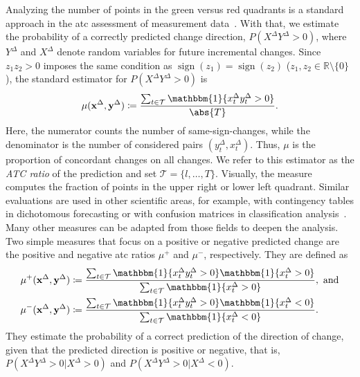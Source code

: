\documentclass[pdflatex]{sn-jnl}
\theoremstyle{plain}%
\theoremstyle{definition}
\DeclarePairedDelimiter{\abs}\lvert\rvert
\DeclareMathOperator{\sign}{sign}
\newcommand{\ind}[1]{\mathbbm{1}\{#1\}}
\newcommand{\card}[1]{\abs{#1}}
\newcommand{\R}{\mathbb{R}}
\newcommand{\diffx}{\mathbf{x}^{\Delta}}
\newcommand{\diffy}{\mathbf{y}^{\Delta}}
\newcommand{\diffxrv}{X^{\Delta}}
\newcommand{\diffyrv}{Y^{\Delta}}
\newcommand{\diffxt}[1][t]{x^{\Delta}_{#1}}
\newcommand{\diffyt}[1][t]{y^{\Delta}_{#1}}
\newcommand{\acc}{\mu}
\newcommand{\accp}{\acc^+}
\newcommand{\accm}{\acc^-}
\begin{document}
Analyzing the number of points in the green versus red quadrants is a standard approach in the \ac{atc} assessment of measurement data~\citep{Critchley2010, Saugel2015}.
With that, we estimate the probability of a correctly predicted change direction, $P(\diffxrv \diffyrv > 0)$, where $\diffyrv$ and $\diffxrv$ denote random variables for future incremental changes.
Since $z_1 z_2 > 0$ imposes the same condition as $\sign(z_1) = \sign(z_2)$ ($z_1, z_2 \in \R \setminus \{ 0 \}$), the standard estimator for $P(\diffxrv \diffyrv > 0)$ is
\begin{equation}
    \acc (\diffx, \diffy) \coloneqq \frac{\sum_{t \in \mathcal{T}} \ind{\diffxt \diffyt > 0}}{\card{T}}.\label{eq:acc}
\end{equation}
Here, the numerator counts the number of same-sign-changes, while the denominator is the number of considered pairs $(\diffyt, \diffxt)$.
Thus, $\acc$ is the proportion of concordant changes on all changes.
We refer to this estimator as the \textit{ATC ratio} of the prediction and set $\mathcal{T} = \{l, \dots, T\}$.
Visually, the measure computes the fraction of points in the upper right or lower left quadrant.
Similar evaluations are used in other scientific areas, for example, with contingency tables in dichotomous forecasting or with confusion matrices in classification analysis~\citetext{see, e.g., the introductions in \citealt{James2021}, Ch. 4, and \citealp{Jolliffe2012}, Ch. 3}.
Many other measures can be adapted from those fields to deepen the analysis.
Two simple measures that focus on a positive or negative predicted change are the positive and negative \ac{atc} ratios $\accp$ and $\accm$, respectively.
They are defined as
\begin{align}
    \accp (\diffx, \diffy) &\coloneqq \frac{\sum_{t \in \mathcal{T}} \ind{\diffxt \diffyt > 0} \ind{\diffxt > 0}}{\sum_{t \in \mathcal{T}} \ind{\diffxt > 0}},\ \text{and} \label{eq:accp}\\
    \accm (\diffx, \diffy) &\coloneqq \frac{\sum_{t \in \mathcal{T}} \ind{\diffxt \diffyt > 0} \ind{\diffxt < 0}}{\sum_{t \in \mathcal{T}} \ind{\diffxt < 0}}.\label{eq:accm}
\end{align}
They estimate the probability of a correct prediction of the direction of change, given that the predicted direction is positive or negative, that is, $P(\diffxrv \diffyrv > 0 | \diffxrv > 0)$ and $P(\diffxrv \diffyrv > 0 | \diffxrv < 0)$.
\end{document}
